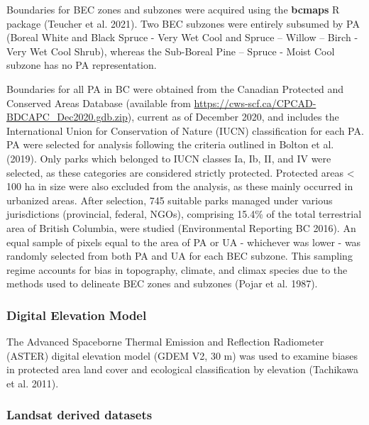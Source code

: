 \documentclass[11pt]{article}
\begin{document}
Boundaries for BEC zones and subzones were acquired using the
\textbf{bcmaps} R package (Teucher et al. 2021). Two BEC subzones were
entirely subsumed by PA (Boreal White and Black Spruce - Very Wet Cool
and Spruce -- Willow -- Birch - Very Wet Cool Shrub), whereas the
Sub-Boreal Pine -- Spruce - Moist Cool subzone has no PA representation.

Boundaries for all PA in BC were obtained from the Canadian Protected
and Conserved Areas Database (available from
\url{https://cws-scf.ca/CPCAD-BDCAPC_Dec2020.gdb.zip}), current as of
December 2020, and includes the International Union for Conservation of
Nature (IUCN) classification for each PA. PA were selected for analysis
following the criteria outlined in Bolton et al. (2019). Only parks
which belonged to IUCN classes Ia, Ib, II, and IV were selected, as
these categories are considered strictly protected. Protected areas
\textless{} 100 ha in size were also excluded from the analysis, as
these mainly occurred in urbanized areas. After selection, 745 suitable
parks managed under various jurisdictions (provincial, federal, NGOs),
comprising 15.4\% of the total terrestrial area of British Columbia,
were studied (Environmental Reporting BC 2016). An equal sample of
pixels equal to the area of PA or UA - whichever was lower - was
randomly selected from both PA and UA for each BEC subzone. This
sampling regime accounts for bias in topography, climate, and climax
species due to the methods used to delineate BEC zones and subzones
(Pojar et al. 1987).

\hypertarget{digital-elevation-model}{%
\subsubsection{Digital Elevation Model}\label{digital-elevation-model}}

The Advanced Spaceborne Thermal Emission and Reflection Radiometer
(ASTER) digital elevation model (GDEM V2, 30 m) was used to examine
biases in protected area land cover and ecological classification by
elevation (Tachikawa et al. 2011).

\hypertarget{landsat-derived-datasets}{%
\subsubsection{Landsat derived
datasets}\label{landsat-derived-datasets}}
\end{document}
